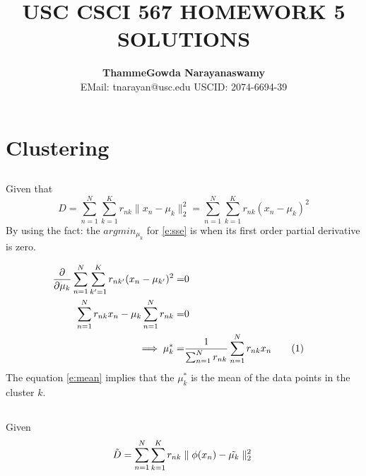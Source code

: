 \documentclass[a4paper,doc,notimes]{article}
\title{\noindent  \textbf{ USC CSCI 567 HOMEWORK 5 SOLUTIONS} }
\author{\textbf{ThammeGowda Narayanaswamy} \\
EMail: tnarayan@usc.edu  USCID: 2074-6694-39}
\newcommand\numberthis{\addtocounter{equation}{1}\tag{\theequation}}
\begin{document}
\maketitle

\section{Clustering}
\subsection{}
Given that 
\begin{equation}\label{e:sse}
	D = \sum_{n=1}^{N} \sum_{k=1}^{K} r_{nk} \parallel x_n - \mu_k \parallel^2_2 = \sum_{n=1}^{N} \sum_{k=1}^{K} r_{nk} (x_n - \mu_k)^2
\end{equation}
By using the fact: the $argmin_{\mu_k}$ for \ref{e:sse} is when its first order partial derivative is zero.

\begin{align*}
  \frac{\partial}{\partial \mu_k} \sum_{n=1}^{N} \sum_{k'=1}^{K} r_{nk'} (x_n - \mu_{k'})^2 =& 0 & \\
   \sum_{n=1}^{N} r_{nk} x_n - \mu_k \sum_{n=1}^{N} r_{nk}  =& 0 & \\ 
   \implies \mu_k^* =& \frac{1}{\sum_{n=1}^{N} r_{nk}} \sum_{n=1}^{N} r_{nk} x_n \numberthis \label{e:mean}
\end{align*}
The equation \ref{e:mean} implies that the $\mu_k^*$ is the mean of the data points in the cluster $k$.

\subsection{}

\subsection{}

Given
\begin{equation}
	\tilde{D} = \sum_{n=1}^{N} \sum_{k=1}^{K} r_{nk} \parallel\phi(x_n) - \tilde{\mu_k} \parallel_2^2 \\
\end{equation}
\end{document}

